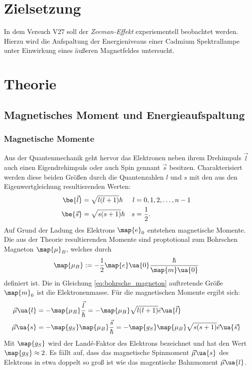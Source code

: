 \setcounter{page}{1}
\section*{Zielsetzung}
In dem Versuch V27 soll der \emph{Zeeman-Effekt} experiementell beobachtet werden.
Hierzu wird die Aufspaltung der Energieniveaus einer Cadmium Spektrallampe
unter Einwirkung eines äußeren Magnetfeldes untersucht.

\section{Theorie}

\subsection{Magnetisches Moment und Energieaufspaltung}
\subsubsection{Magnetische Momente}
Aus der Quantenmechanik geht hervor das Elektronen neben ihrem Drehimpuls $\vec{l}$ auch einen
Eigendrehimpuls oder auch Spin gennant $\vec{s}$ besitzen. Charakterisiert werden diese beiden Größen durch die
Quantenzahlen $l$ und $s$ mit den aus den Eigenwertgleichung resultierenden Werten:
\begin{align*}
\be{\vec{l}}&=\sqrt{l(l+1)}\hbar & l&=0,1,2,\dots,n-1\\
\be{\vec{s}}&=\sqrt{s(s+1)}\hbar & s&=\frac{1}{2}.
\end{align*}
Auf Grund der Ladung des Elektrons $\map{e}_0$ entstehen magnetische Momente.
Die aus der Theorie resultierenden Momente sind proptotional zum Bohrschen Magneton $\map{\mu}_B$, welches durch
\begin{equation}
  \label{eq:bohrsche_magneton}
  \map{\mu_B}:=-\frac{1}{2}\map{e}\ua{0} \frac{\hbar}{\map{m}\ua{0}}
\end{equation}
definiert ist. Die in Gleichung \eqref{eq:bohrsche_magneton} auftretende Größe $\map{m}_0$ ist die Elektronenmasse.
Für die magnetischen Momente ergibt sich:
\begin{align*}
  \vec{\mu}\ua{l}&=-\map{\mu_B}\frac{\vec{l}}{\hbar}=-\map{\mu_B}\sqrt{l(l+1)}\vec{e}\ua{\vec{l}} \\
  \vec{\mu}\ua{s}&=-\map{g_S}\map{\mu_B}\frac{\vec{s}}{\hbar}=-\map{g_S}\map{\mu_B}\sqrt{s(s+1)}\vec{e}\ua{\vec{s}}
\end{align*}
Mit $\map{g_S}$ wird der Landé-Faktor des Elektrons bezeichnet und hat den Wert $\map{g_S}\approx 2$.
Es fällt auf, dass das magnetische Spinmoment $\vec{\mu}\ua{s}$ des Elektrons in etwa doppelt
so groß ist wie das magentische Bahnmoment $\vec{\mu}\ua{l}$.

